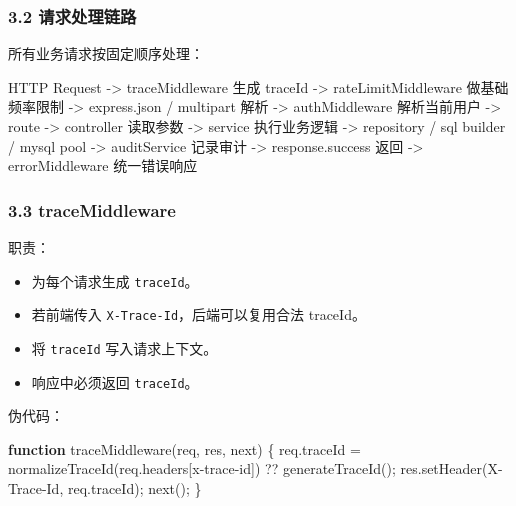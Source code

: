 \documentclass[
  a4paper,
  UTF8]{ctexart}
\newenvironment{Shaded}{}{}
\newcommand{\AttributeTok}[1]{\textcolor[rgb]{0.49,0.56,0.16}{#1}}
\newcommand{\FunctionTok}[1]{\textcolor[rgb]{0.02,0.16,0.49}{#1}}
\newcommand{\KeywordTok}[1]{\textcolor[rgb]{0.00,0.44,0.13}{\textbf{#1}}}
\newcommand{\NormalTok}[1]{#1}
\newcommand{\OperatorTok}[1]{\textcolor[rgb]{0.40,0.40,0.40}{#1}}
\newcommand{\StringTok}[1]{\textcolor[rgb]{0.25,0.44,0.63}{#1}}
\providecommand{\tightlist}{%
  \setlength{\itemsep}{0pt}\setlength{\parskip}{0pt}}
\begin{document}
\hypertarget{ux8bf7ux6c42ux5904ux7406ux94feux8def}{%
\subsubsection{3.2
请求处理链路}\label{ux8bf7ux6c42ux5904ux7406ux94feux8def}}

所有业务请求按固定顺序处理：

\begin{Shaded}
\begin{Highlighting}[]
\NormalTok{HTTP Request}
\NormalTok{  {-}\textgreater{} traceMiddleware 生成 traceId}
\NormalTok{  {-}\textgreater{} rateLimitMiddleware 做基础频率限制}
\NormalTok{  {-}\textgreater{} express.json / multipart 解析}
\NormalTok{  {-}\textgreater{} authMiddleware 解析当前用户}
\NormalTok{  {-}\textgreater{} route}
\NormalTok{  {-}\textgreater{} controller 读取参数}
\NormalTok{  {-}\textgreater{} service 执行业务逻辑}
\NormalTok{  {-}\textgreater{} repository / sql builder / mysql pool}
\NormalTok{  {-}\textgreater{} auditService 记录审计}
\NormalTok{  {-}\textgreater{} response.success 返回}
\NormalTok{  {-}\textgreater{} errorMiddleware 统一错误响应}
\end{Highlighting}
\end{Shaded}

\hypertarget{tracemiddleware}{%
\subsubsection{3.3 traceMiddleware}\label{tracemiddleware}}

职责：

\begin{itemize}
\tightlist
\item
  为每个请求生成 \texttt{traceId}。
\item
  若前端传入 \texttt{X-Trace-Id}，后端可以复用合法 traceId。
\item
  将 \texttt{traceId} 写入请求上下文。
\item
  响应中必须返回 \texttt{traceId}。
\end{itemize}

伪代码：

\begin{Shaded}
\begin{Highlighting}[]
\KeywordTok{function} \FunctionTok{traceMiddleware}\NormalTok{(req}\OperatorTok{,}\NormalTok{ res}\OperatorTok{,}\NormalTok{ next) \{}
\NormalTok{  req}\OperatorTok{.}\AttributeTok{traceId} \OperatorTok{=} \FunctionTok{normalizeTraceId}\NormalTok{(req}\OperatorTok{.}\AttributeTok{headers}\NormalTok{[}\StringTok{\textquotesingle{}x{-}trace{-}id\textquotesingle{}}\NormalTok{]) }\OperatorTok{??} \FunctionTok{generateTraceId}\NormalTok{()}\OperatorTok{;}
\NormalTok{  res}\OperatorTok{.}\FunctionTok{setHeader}\NormalTok{(}\StringTok{\textquotesingle{}X{-}Trace{-}Id\textquotesingle{}}\OperatorTok{,}\NormalTok{ req}\OperatorTok{.}\AttributeTok{traceId}\NormalTok{)}\OperatorTok{;}
  \FunctionTok{next}\NormalTok{()}\OperatorTok{;}
\NormalTok{\}}
\end{Highlighting}
\end{Shaded}
\end{document}
